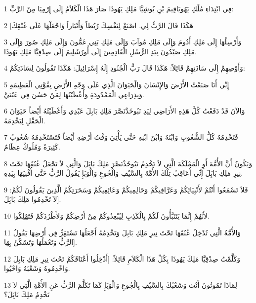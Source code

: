 \par 1 فِي ابْتِدَاءِ مُلْكِ يَهُويَاقِيمَ بْنِ يُوشِيَّا مَلِكِ يَهُوذَا صَارَ هَذَا الْكَلاَمُ إِلَى إِرْمِيَا مِنْ الرَّبِّ:
\par 2 [هَكَذَا قَالَ الرَّبُّ لِي. اصْنَعْ لِنَفْسِكَ رُبُطاً وَأَنْيَاراً وَاجْعَلْهَا عَلَى عُنْقِكَ
\par 3 وَأَرْسِلْهَا إِلَى مَلِكِ أَدُومَ وَإِلَى مَلِكِ مُوآبَ وَإِلَى مَلِكِ بَنِي عَمُّونَ وَإِلَى مَلِكِ صُورَ وَإِلَى مَلِكِ صَيْدُونَ بِيَدِ الرُّسُلِ الْقَادِمِينَ إِلَى أُورُشَلِيمَ إِلَى صِدْقِيَّا مَلِكِ يَهُوذَا.
\par 4 وَأَوْصِهِمْ إِلَى سَادَتِهِمْ قَائِلاً: هَكَذَا قَالَ رَبُّ الْجُنُودِ إِلَهُ إِسْرَائِيلَ: هَكَذَا تَقُولُونَ لِسَادَتِكُمْ:
\par 5 إِنِّي أَنَا صَنَعْتُ الأَرْضَ وَالإِنْسَانَ وَالْحَيَوَانَ الَّذِي عَلَى وَجْهِ الأَرْضِ بِقُوَّتِي الْعَظِيمَةِ وَبِذِرَاعِي الْمَمْدُودَةِ وَأَعْطَيْتُهَا لِمَنْ حَسُنَ فِي عَيْنَيَّ.
\par 6 وَالآنَ قَدْ دَفَعْتُ كُلَّ هَذِهِ الأَرَاضِي لِيَدِ نَبُوخَذْنَصَّرَ مَلِكِ بَابِلَ عَبْدِي وَأَعْطَيْتُهُ أَيْضاً حَيَوَانَ الْحَقْلِ لِيَخْدِمَهُ.
\par 7 فَتَخْدِمُهُ كُلُّ الشُّعُوبِ وَابْنَهُ وَابْنَ ابْنِهِ حَتَّى يَأْتِيَ وَقْتُ أَرْضِهِ أَيْضاً فَتَسْتَخْدِمُهُ شُعُوبٌ كَثِيرَةٌ وَمُلُوكٌ عِظَامٌ.
\par 8 وَيَكُونُ أَنَّ الأُمَّةَ أَوِ الْمَمْلَكَةَ الَّتِي لاَ تَخْدِمُ نَبُوخَذْنَصَّرَ مَلِكَ بَابَِلَ وَالَّتِي لاَ تَجْعَلُ عُنُقَهَا تَحْتَ نِيرِ مَلِكِ بَابَِلَ إِنِّي أُعَاقِبُ تِلْكَ الأُمَّةَ بِالسَّيْفِ وَالْجُوعِ وَالْوَبَإِ يَقُولُ الرَّبُّ حَتَّى أُفْنِيَهَا بِيَدِهِ.
\par 9 فَلاَ تَسْمَعُوا أَنْتُمْ لأَنْبِيَائِكُمْ وَعَرَّافِيكُمْ وَحَالِمِيكُمْ وَعَائِفِيكُمْ وَسَحَرَتِكُمُ الَّذِينَ يَقُولُونَ لَكُمْ: [لاَ تَخْدِمُوا مَلِكَ بَابَِلَ.
\par 10 لأَنَّهُمْ إِنَّمَا يَتَنَبَّأُونَ لَكُمْ بِالْكَذِبِ لِيُبْعِدُوكُمْ مِنْ أَرْضِكُمْ وَلأَطْرُدَكُمْ فَتَهْلِكُوا.
\par 11 وَالأُمَّةُ الَّتِي تُدْخِلُ عُنُقَهَا تَحْتَ نِيرِ مَلِكِ بَابِلَ وَتَخْدِمُهُ أَجْعَلُهَا تَسْتَقِرُّ فِي أَرْضِهَا يَقُولُ الرَّبُّ وَتَعْمَلُهَا وَتَسْكُنُ بِهَا].
\par 12 وَكَلَّمْتُ صِدْقِيَّا مَلِكَ يَهُوذَا بِكُلِّ هَذَا الْكَلاَمِ قَائِلاً: [أَدْخِلُوا أَعْنَاقَكُمْ تَحْتَ نِيرِ مَلِكِ بَابِلَ وَاخْدِمُوهُ وَشَعْبَهُ وَاحْيُوا.
\par 13 لِمَاذَا تَمُوتُونَ أَنْتَ وَشَعْبُكَ بِالسَّيْفِ بِالْجُوعِ وَالْوَبَإِ كَمَا تَكَلَّمَ الرَّبُّ عَنِ الأُمَّةِ الَّتِي لاَ تَخْدِمُ مَلِكَ بَابَِلَ؟
